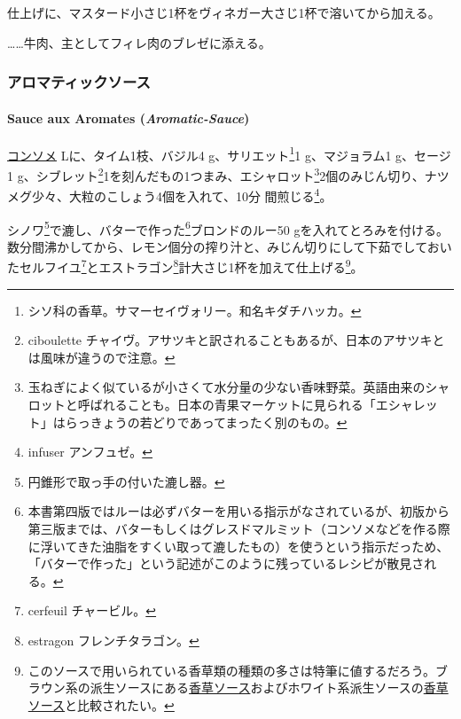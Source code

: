 \begin{recette}
仕上げに、マスタード小さじ1杯をヴィネガー大さじ1杯で溶いてから加える。

\ldots{}\ldots{}牛肉、主としてフィレ肉のブレゼに添える。

\maeaki

\hypertarget{ux30a2ux30edux30deux30c6ux30a3ux30c3ux30afux30bdux30fcux30b9}{%
\subsubsection{アロマティックソース}\label{ux30a2ux30edux30deux30c6ux30a3ux30c3ux30afux30bdux30fcux30b9}}

\hypertarget{aromatic-sauce}{%
\paragraph{\texorpdfstring{Sauce aux Aromates
(\emph{Aromatic-Sauce})}{Sauce aux Aromates (Aromatic-Sauce)}}\label{aromatic-sauce}}



\protect\hyperlink{}{コンソメ}\undemi{} Lに、タイム1枝、バジル4
g、サリエット\footnote{シソ科の香草。サマーセイヴォリー。和名キダチハッカ。}1
g、マジョラム1 g、セージ1 g、シブレット\footnote{ciboulette
  チャイヴ。アサツキと訳されることもあるが、日本のアサツキとは風味が違うので注意。}1を刻んだもの1つまみ、エシャロット\footnote{玉ねぎによく似ているが小さくて水分量の少ない香味野菜。英語由来のシャロットと呼ばれることも。日本の青果マーケットに見られる「エシャレット」はらっきょうの若どりであってまったく別のもの。}2個のみじん切り、ナツメグ少々、大粒のこしょう4個を入れて、10分
間煎じる\footnote{infuser アンフュゼ。}。

シノワ\footnote{円錐形で取っ手の付いた漉し器。}で漉し、バターで作った\footnote{本書第四版ではルーは必ずバターを用いる指示がなされているが、初版から第三版までは、バターもしくはグレスドマルミット（コンソメなどを作る際に浮いてきた油脂をすくい取って漉したもの）を使うという指示だっため、「バターで作った」という記述がこのように残っているレシピが散見される。}ブロンドのルー50
gを入れてとろみを付ける。数分間沸かしてから、レモン\undemi{}個分の搾り汁と、みじん切りにして下茹でしておいたセルフイユ\footnote{cerfeuil
  チャービル。}とエストラゴン\footnote{estragon フレンチタラゴン。}計大さじ1杯を加えて仕上げる\footnote{このソースで用いられている香草類の種類の多さは特筆に値するだろう。ブラウン系の派生ソースにある\protect\hyperlink{sauce-aux-fines-herbes}{香草ソース}およびホワイト系派生ソースの\protect\hyperlink{sauce-aux-fines-herbes-blanche}{香草ソース}と比較されたい。}。


\end{recette}
